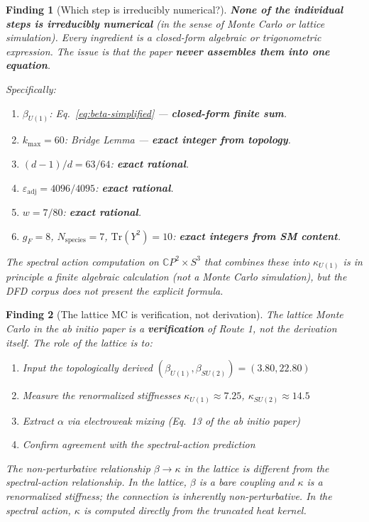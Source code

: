 \documentclass[11pt,a4paper]{article}
\newtheorem{finding}{Finding}
\theoremstyle{definition}
\begin{document}
\begin{finding}[Which step is irreducibly numerical?]
\textbf{None of the individual steps is irreducibly numerical} (in the sense
of Monte Carlo or lattice simulation).  Every ingredient is a closed-form
algebraic or trigonometric expression.  The issue is that the paper
\textbf{never assembles them into one equation}.

Specifically:
\begin{enumerate}
\item $\beta_{U(1)}$: Eq.~\eqref{eq:beta-simplified} --- \textbf{closed-form finite sum}.
\item $k_{\max} = 60$: Bridge Lemma --- \textbf{exact integer from topology}.
\item $(d{-}1)/d = 63/64$: \textbf{exact rational}.
\item $\varepsilon_{\mathrm{adj}} = 4096/4095$: \textbf{exact rational}.
\item $w = 7/80$: \textbf{exact rational}.
\item $g_F = 8$, $N_{\mathrm{species}} = 7$, $\mathrm{Tr}(Y^2) = 10$:
\textbf{exact integers from SM content}.
\end{enumerate}

The spectral action computation on $\mathbb{C}P^2 \times S^3$ that combines
these into $\kappa_{U(1)}$ is in principle a finite algebraic calculation
(not a Monte Carlo simulation), but the DFD corpus does not present the
explicit formula.
\end{finding}

\begin{finding}[The lattice MC is verification, not derivation]
The lattice Monte Carlo in the ab initio paper is a \textbf{verification} of
Route 1, not the derivation itself.  The role of the lattice is to:
\begin{enumerate}
\item Input the topologically derived $(\beta_{U(1)}, \beta_{SU(2)}) = (3.80, 22.80)$
\item Measure the renormalized stiffnesses $\kappa_{U(1)} \approx 7.25$,
$\kappa_{SU(2)} \approx 14.5$
\item Extract $\alpha$ via electroweak mixing (Eq.~13 of the ab initio paper)
\item Confirm agreement with the spectral-action prediction
\end{enumerate}
The non-perturbative relationship $\beta \to \kappa$ in the lattice is different
from the spectral-action relationship.  In the lattice, $\beta$ is a bare coupling
and $\kappa$ is a renormalized stiffness; the connection is inherently
non-perturbative.  In the spectral action, $\kappa$ is computed directly from the
truncated heat kernel.
\end{finding}
\end{document}
